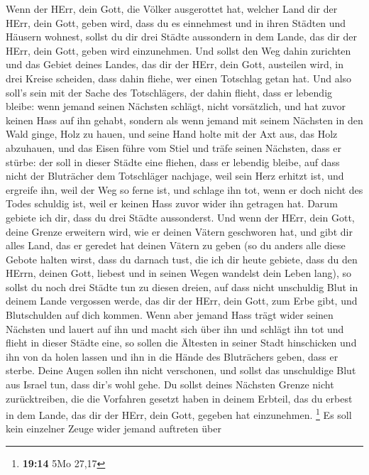  Wenn der HErr, dein Gott, die Völker ausgerottet hat,
welcher Land dir der HErr, dein Gott, geben wird, dass du es einnehmest
und in ihren Städten und Häusern wohnest,  sollst du dir
drei Städte aussondern in dem Lande, das dir der HErr, dein Gott, geben
wird einzunehmen.  Und sollst den Weg dahin zurichten und
das Gebiet deines Landes, das dir der HErr, dein Gott, austeilen wird,
in drei Kreise scheiden, dass dahin fliehe, wer einen Totschlag getan
hat.  Und also soll's sein mit der Sache des Totschlägers,
der dahin flieht, dass er lebendig bleibe: wenn jemand seinen Nächsten
schlägt, nicht vorsätzlich, und hat zuvor keinen Hass auf ihn gehabt,
 sondern als wenn jemand mit seinem Nächsten in den Wald
ginge, Holz zu hauen, und seine Hand holte mit der Axt aus, das Holz
abzuhauen, und das Eisen führe vom Stiel und träfe seinen Nächsten, dass
er stürbe: der soll in dieser Städte eine fliehen, dass er lebendig
bleibe,  auf dass nicht der Bluträcher dem Totschläger
nachjage, weil sein Herz erhitzt ist, und ergreife ihn, weil der Weg so
ferne ist, und schlage ihn tot, wenn er doch nicht des Todes schuldig
ist, weil er keinen Hass zuvor wider ihn getragen hat. 
Darum gebiete ich dir, dass du drei Städte aussonderst. 
Und wenn der HErr, dein Gott, deine Grenze erweitern wird, wie er deinen
Vätern geschworen hat, und gibt dir alles Land, das er geredet hat
deinen Vätern zu geben  (so du anders alle diese Gebote
halten wirst, dass du darnach tust, die ich dir heute gebiete, dass du
den HErrn, deinen Gott, liebest und in seinen Wegen wandelst dein Leben
lang), so sollst du noch drei Städte tun zu diesen dreien,
 auf dass nicht unschuldig Blut in deinem Lande vergossen
werde, das dir der HErr, dein Gott, zum Erbe gibt, und Blutschulden auf
dich kommen.  Wenn aber jemand Hass trägt wider seinen
Nächsten und lauert auf ihn und macht sich über ihn und schlägt ihn tot
und flieht in dieser Städte eine,  so sollen die Ältesten
in seiner Stadt hinschicken und ihn von da holen lassen und ihn in die
Hände des Bluträchers geben, dass er sterbe.  Deine Augen
sollen ihn nicht verschonen, und sollst das unschuldige Blut aus Israel
tun, dass dir's wohl gehe.  Du sollst deines Nächsten
Grenze nicht zurücktreiben, die die Vorfahren gesetzt haben in deinem
Erbteil, das du erbest in dem Lande, das dir der HErr, dein Gott,
gegeben hat einzunehmen. \footnote{\textbf{19:14} 5Mo 27,17}
 Es soll kein einzelner Zeuge wider jemand auftreten über
